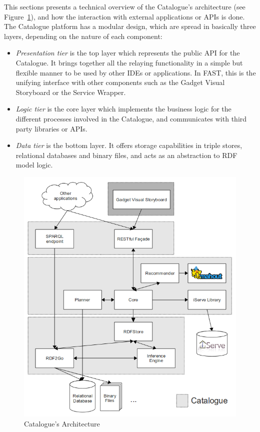 \documentclass{fast_latex}
\begin{document}
This sections presents a technical overview of the Catalogue's architecture (see Figure~\ref{fig:catalogue_architecture}), and how the interaction with external applications or APIs is done. The Catalogue platform has a modular design, which are spread in basically three layers, depending on the nature of each component:
\begin{itemize}
 \item \emph{Presentation tier} is the top layer which represents the public API for the Catalogue. It brings together all the relaying functionality in a simple but flexible manner to be used by other IDEs or applications. In FAST, this is the unifying interface with other components such as the Gadget Visual Storyboard or the Service Wrapper.
 \item \emph{Logic tier} is the core layer which implements the business logic for the different processes involved in the Catalogue, and communicates with third party libraries or APIs.
 \item \emph{Data tier} is the bottom layer. It offers storage capabilities in triple stores, relational databases and binary files, and acts as an abstraction to RDF model logic.
\end{itemize}

\begin{figure}[htb]
\label{fig:catalogue_architecture}
\begin{center}
	\includegraphics[width=13cm]{images/catalogue_architecture}
	\caption{Catalogue's Architecture}
\end{center}
\end{figure}
\end{document}
